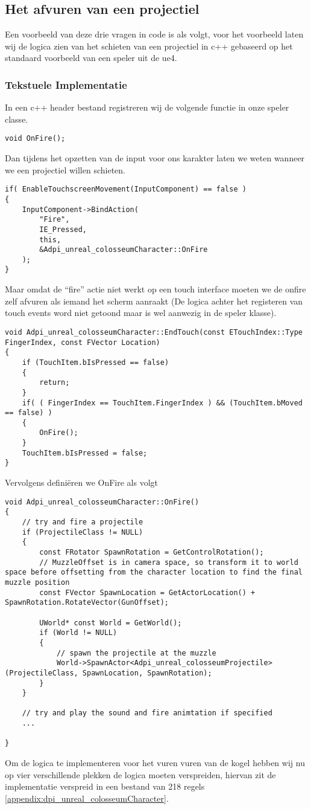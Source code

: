 \subsection{Het afvuren van een projectiel}
Een voorbeeld van deze drie vragen in code is als volgt, voor het voorbeeld laten wij de logica zien van het schieten van een projectiel in c++ gebaseerd op het standaard voorbeeld van een speler uit de \gls{ue4}.

\subsubsection{Tekstuele Implementatie}
In een c++ header bestand registreren wij de volgende functie in onze speler classe.
\begin{lstlisting}
void OnFire();
\end{lstlisting}
Dan tijdens het opzetten van de input voor ons karakter laten we weten wanneer we een projectiel willen schieten.

\begin{lstlisting}
if( EnableTouchscreenMovement(InputComponent) == false )
{
	InputComponent->BindAction(
		"Fire", 
		IE_Pressed, 
		this, 
		&Adpi_unreal_colosseumCharacter::OnFire
	);
}
\end{lstlisting}
Maar omdat de “fire” actie niet werkt op een touch interface moeten we de onfire zelf afvuren als iemand het scherm aanraakt (De logica achter het registeren van touch events word niet getoond maar is wel aanwezig in de speler klasse).

\begin{lstlisting}
void Adpi_unreal_colosseumCharacter::EndTouch(const ETouchIndex::Type FingerIndex, const FVector Location)
{
	if (TouchItem.bIsPressed == false)
	{
		return;
	}
	if( ( FingerIndex == TouchItem.FingerIndex ) && (TouchItem.bMoved == false) )
	{
		OnFire();
	}
	TouchItem.bIsPressed = false;
}
\end{lstlisting}
Vervolgens definiëren we OnFire als volgt

\begin{lstlisting}
void Adpi_unreal_colosseumCharacter::OnFire()
{ 
	// try and fire a projectile
	if (ProjectileClass != NULL)
	{
		const FRotator SpawnRotation = GetControlRotation();
		// MuzzleOffset is in camera space, so transform it to world space before offsetting from the character location to find the final muzzle position
		const FVector SpawnLocation = GetActorLocation() + SpawnRotation.RotateVector(GunOffset);

		UWorld* const World = GetWorld();
		if (World != NULL)
		{
			// spawn the projectile at the muzzle
			World->SpawnActor<Adpi_unreal_colosseumProjectile>(ProjectileClass, SpawnLocation, SpawnRotation);
		}
	}

	// try and play the sound and fire animtation if specified
	...

}
\end{lstlisting}
Om de logica te implementeren voor het vuren vuren van de kogel hebben wij nu op vier verschillende plekken de logica moeten verspreiden, hiervan zit de implementatie verspreid in een bestand van 218 regels \ref{appendix:dpi_unreal_colosseumCharacter}.

